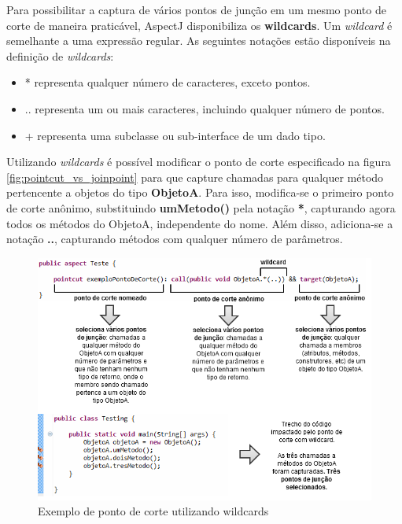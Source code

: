 Para possibilitar a captura de vários pontos de junção em um mesmo ponto de
corte de maneira praticável, AspectJ disponibiliza os \textbf{wildcards}. 
Um \textit{wildcard} é semelhante a uma expressão regular. As seguintes notações
estão disponíveis na definição de \textit{wildcards}:

\begin{itemize}
  \item * representa qualquer número de caracteres, exceto pontos.
  \item .. representa um ou mais caracteres, incluindo qualquer número de
  pontos.
  \item + representa uma subclasse ou sub-interface de um dado tipo.
\end{itemize}

Utilizando \textit{wildcards} é possível modificar o ponto de corte especificado na figura \ref{fig:pointcut_vs_joinpoint} para que capture chamadas
para qualquer método pertencente a objetos do tipo \textbf{ObjetoA}. Para isso, modifica-se o primeiro ponto de corte anônimo, substituindo
\textbf{umMetodo()} pela notação \textbf{*}, capturando agora todos os métodos do ObjetoA, independente do nome. Além disso, adiciona-se a 
notação \textbf{..}, capturando métodos com qualquer número de parâmetros. 

\begin{landscape}
\begin{figure}
	\centering
	\includegraphics[scale=0.9]{img/pointcut_vs_joinpoint_wildcard.png}
	\caption{Exemplo de ponto de corte utilizando wildcards}\label{fig:pointcut_vs_joinpoint_wildcard}
\end{figure}
\end{landscape}

